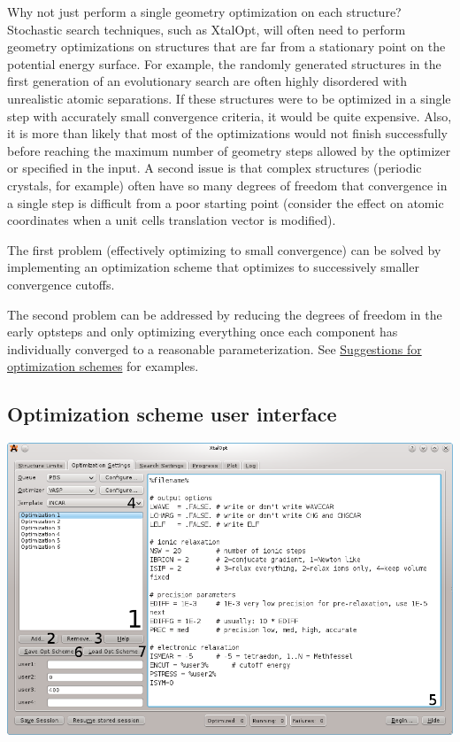 Why not just perform a single geometry optimization on each structure? Stochastic search techniques, such as Xtal\+Opt, will often need to perform geometry optimizations on structures that are far from a stationary point on the potential energy surface. For example, the randomly generated structures in the first generation of an evolutionary search are often highly disordered with unrealistic atomic separations. If these structures were to be optimized in a single step with accurately small convergence criteria, it would be quite expensive. Also, it is more than likely that most of the optimizations would not finish successfully before reaching the maximum number of geometry steps allowed by the optimizer or specified in the input. A second issue is that complex structures (periodic crystals, for example) often have so many degrees of freedom that convergence in a single step is difficult from a poor starting point (consider the effect on atomic coordinates when a unit cell\textquotesingle{}s translation vector is modified).

The first problem (effectively optimizing to small convergence) can be solved by implementing an optimization scheme that optimizes to successively smaller convergence cutoffs.

The second problem can be addressed by reducing the degrees of freedom in the early optsteps and only optimizing everything once each component has individually converged to a reasonable parameterization. See \hyperlink{optschemes_suggest}{Suggestions for optimization schemes} for examples.\hypertarget{optschemes_gui}{}\subsection{Optimization scheme user interface}\label{optschemes_gui}
 
\begin{DoxyImageNoCaption}
  \mbox{\includegraphics[width=\textwidth]{optschemes-numberededitor.png}}
\end{DoxyImageNoCaption}


